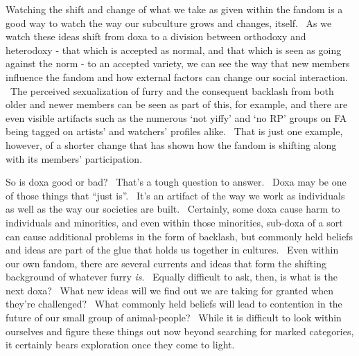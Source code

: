 Watching the shift and change of what we take as given within the fandom
is a good way to watch the way our subculture grows and changes, itself.
~As we watch these ideas shift from doxa to a division between orthodoxy
and heterodoxy - that which is accepted as normal, and that which is
seen as going against the norm - to an accepted variety, we can see the
way that new members influence the fandom and how external factors can
change our social interaction. ~The perceived sexualization of furry and
the consequent backlash from both older and newer members can be seen as
part of this, for example, and there are even visible artifacts such as
the numerous `not yiffy' and `no RP' groups on FA being tagged on
artists' and watchers' profiles alike. ~That is just one example,
however, of a shorter change that has shown how the fandom is shifting
along with its members' participation.

So is doxa good or bad? ~That's a tough question to answer. ~Doxa may be
one of those things that ``just is''. ~It's an artifact of the way we
work as individuals as well as the way our societies are built.
~Certainly, some doxa cause harm to individuals and minorities, and even
within those minorities, sub-doxa of a sort can cause additional
problems in the form of backlash, but commonly held beliefs and ideas
are part of the glue that holds us together in cultures. ~Even within
our own fandom, there are several currents and ideas that form the
shifting background of whatever furry \emph{is}. ~Equally difficult to
ask, then, is what is the next doxa? ~What new ideas will we find out we
are taking for granted when they're challenged? ~What commonly held
beliefs will lead to contention in the future of our small group of
animal-people? ~While it is difficult to look within ourselves and
figure these things out now beyond searching for marked categories, it
certainly bears exploration once they come to light.
